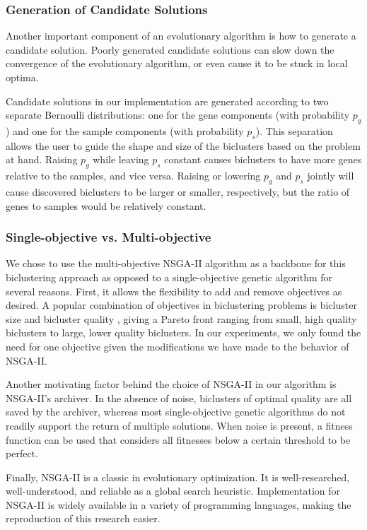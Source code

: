 \subsubsection{Generation of Candidate Solutions}
Another important component of an evolutionary algorithm is how to generate a candidate solution.
Poorly generated candidate solutions can slow down the convergence of the evolutionary algorithm, or even cause it to be stuck in local optima.

Candidate solutions in our implementation are generated according to two separate Bernoulli distributions: one for the gene components (with probability $p_g$) and one for the sample components (with probability $p_s$).
This separation allows the user to guide the shape and size of the biclusters based on the problem at hand.
Raising $p_g$ while leaving $p_s$ constant causes biclusters to have more genes relative to the samples, and vice versa.
Raising or lowering $p_g$ and $p_s$ jointly will cause discovered biclusters to be larger or smaller, respectively, but the ratio of genes to samples would be relatively constant.

\subsubsection{Single-objective vs. Multi-objective}
We chose to use the multi-objective NSGA-II algorithm as a backbone for this biclustering approach as opposed to a single-objective genetic algorithm for several reasons. First, it allows the flexibility to add and remove objectives as desired. A popular combination of objectives in biclustering problems is bicluster size and bicluster quality \cite{mitra2006multi}, giving a Pareto front ranging from small, high quality biclusters to large, lower quality biclusters. In our experiments, we only found the need for one objective given the modifications we have made to the behavior of NSGA-II.

Another motivating factor behind the choice of NSGA-II in our algorithm is NSGA-II's archiver. In the absence of noise, biclusters of optimal quality are all saved by the archiver, whereas most single-objective genetic algorithms do not readily support the return of multiple solutions. When noise is present, a fitness function can be used that considers all fitnesses below a certain threshold to be perfect.

Finally, NSGA-II is a classic in evolutionary optimization. It is well-researched, well-understood, and reliable as a global search heuristic. Implementation for NSGA-II is widely available in a variety of programming languages, making the reproduction of this research easier.

